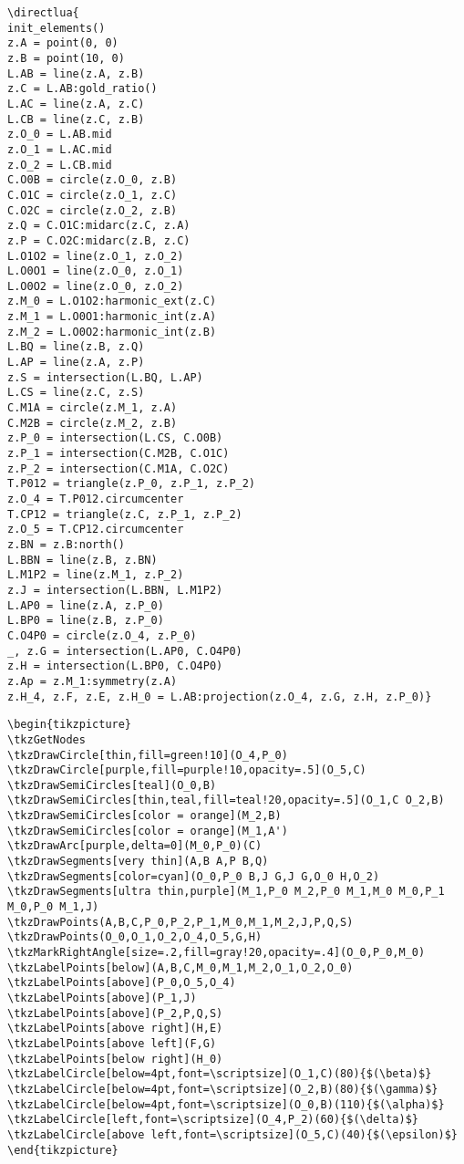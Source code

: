 \begin{verbatim}
\directlua{
init_elements()
z.A = point(0, 0)
z.B = point(10, 0)
L.AB = line(z.A, z.B)
z.C = L.AB:gold_ratio()
L.AC = line(z.A, z.C)
L.CB = line(z.C, z.B)
z.O_0 = L.AB.mid
z.O_1 = L.AC.mid
z.O_2 = L.CB.mid
C.O0B = circle(z.O_0, z.B)
C.O1C = circle(z.O_1, z.C)
C.O2C = circle(z.O_2, z.B)
z.Q = C.O1C:midarc(z.C, z.A)
z.P = C.O2C:midarc(z.B, z.C)
L.O1O2 = line(z.O_1, z.O_2)
L.O0O1 = line(z.O_0, z.O_1)
L.O0O2 = line(z.O_0, z.O_2)
z.M_0 = L.O1O2:harmonic_ext(z.C)
z.M_1 = L.O0O1:harmonic_int(z.A)
z.M_2 = L.O0O2:harmonic_int(z.B)
L.BQ = line(z.B, z.Q)
L.AP = line(z.A, z.P)
z.S = intersection(L.BQ, L.AP)
L.CS = line(z.C, z.S)
C.M1A = circle(z.M_1, z.A)
C.M2B = circle(z.M_2, z.B)
z.P_0 = intersection(L.CS, C.O0B)
z.P_1 = intersection(C.M2B, C.O1C)
z.P_2 = intersection(C.M1A, C.O2C)
T.P012 = triangle(z.P_0, z.P_1, z.P_2)
z.O_4 = T.P012.circumcenter
T.CP12 = triangle(z.C, z.P_1, z.P_2)
z.O_5 = T.CP12.circumcenter
z.BN = z.B:north()
L.BBN = line(z.B, z.BN)
L.M1P2 = line(z.M_1, z.P_2)
z.J = intersection(L.BBN, L.M1P2)
L.AP0 = line(z.A, z.P_0)
L.BP0 = line(z.B, z.P_0)
C.O4P0 = circle(z.O_4, z.P_0)
_, z.G = intersection(L.AP0, C.O4P0)
z.H = intersection(L.BP0, C.O4P0)
z.Ap = z.M_1:symmetry(z.A)
z.H_4, z.F, z.E, z.H_0 = L.AB:projection(z.O_4, z.G, z.H, z.P_0)}
\end{verbatim}

\begin{verbatim}
\begin{tikzpicture}
\tkzGetNodes
\tkzDrawCircle[thin,fill=green!10](O_4,P_0)
\tkzDrawCircle[purple,fill=purple!10,opacity=.5](O_5,C)
\tkzDrawSemiCircles[teal](O_0,B)
\tkzDrawSemiCircles[thin,teal,fill=teal!20,opacity=.5](O_1,C O_2,B)
\tkzDrawSemiCircles[color = orange](M_2,B)
\tkzDrawSemiCircles[color = orange](M_1,A')
\tkzDrawArc[purple,delta=0](M_0,P_0)(C)
\tkzDrawSegments[very thin](A,B A,P B,Q)
\tkzDrawSegments[color=cyan](O_0,P_0 B,J G,J G,O_0 H,O_2)
\tkzDrawSegments[ultra thin,purple](M_1,P_0 M_2,P_0 M_1,M_0 M_0,P_1 M_0,P_0 M_1,J)
\tkzDrawPoints(A,B,C,P_0,P_2,P_1,M_0,M_1,M_2,J,P,Q,S)
\tkzDrawPoints(O_0,O_1,O_2,O_4,O_5,G,H)
\tkzMarkRightAngle[size=.2,fill=gray!20,opacity=.4](O_0,P_0,M_0)
\tkzLabelPoints[below](A,B,C,M_0,M_1,M_2,O_1,O_2,O_0)
\tkzLabelPoints[above](P_0,O_5,O_4)
\tkzLabelPoints[above](P_1,J)
\tkzLabelPoints[above](P_2,P,Q,S)
\tkzLabelPoints[above right](H,E)
\tkzLabelPoints[above left](F,G)
\tkzLabelPoints[below right](H_0)
\tkzLabelCircle[below=4pt,font=\scriptsize](O_1,C)(80){$(\beta)$}
\tkzLabelCircle[below=4pt,font=\scriptsize](O_2,B)(80){$(\gamma)$}
\tkzLabelCircle[below=4pt,font=\scriptsize](O_0,B)(110){$(\alpha)$}
\tkzLabelCircle[left,font=\scriptsize](O_4,P_2)(60){$(\delta)$}
\tkzLabelCircle[above left,font=\scriptsize](O_5,C)(40){$(\epsilon)$}
\end{tikzpicture}
\end{verbatim}


